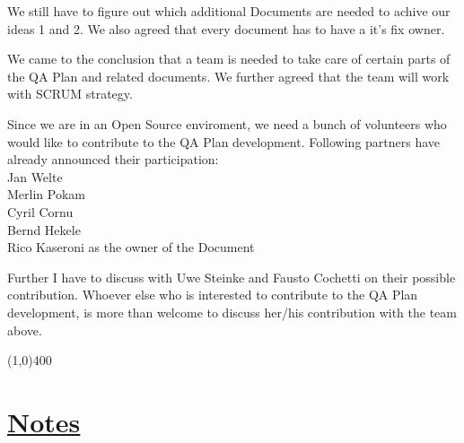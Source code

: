 \documentclass[a4paper]{article}
\begin{document}
We still have to figure out which additional Documents are needed to achive
 our ideas 1 and 2.
 We also agreed that every document has to have a it's fix owner.

 We came to the conclusion that a team is needed to take care of certain
 parts of the QA Plan and related documents.
 We further agreed that the team will work with SCRUM strategy.
 
Since we are in an Open Source enviroment, we need a bunch of volunteers
 who would like to contribute to the QA Plan development.
 Following partners have already announced their participation:\\
 Jan Welte\\
 Merlin Pokam\\
 Cyril Cornu\\
 Bernd Hekele\\
 Rico Kaseroni as the owner of the Document
 
Further I have to discuss with Uwe Steinke and Fausto Cochetti on their
 possible contribution.
 Whoever else who is interested to contribute to the QA Plan development, is
 more than welcome to discuss her/his contribution with the team above.
 


\line(1,0){400}
\section*{\underline{Notes}}
\end{document}
